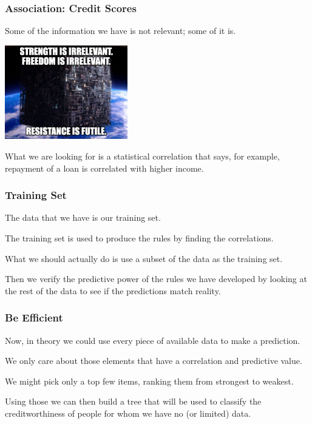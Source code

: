 \begin{frame}
\frametitle{Association: Credit Scores}

Some of the information we have is not relevant; some of it is. 

\begin{center}
	\includegraphics[width=0.4\textwidth]{images/futile.jpg}
\end{center}

What we are looking for is a statistical correlation that says, for example, repayment of a loan is correlated with higher income.


\end{frame}

\begin{frame}
\frametitle{Training Set}

The data that we have is our \alert{training set}. 

The training set is used to produce the rules by finding the correlations. 

What we should actually do is use a subset of the data as the training set. 

Then we verify the predictive power of the rules we have developed by looking at the rest of the data to see if the predictions match reality.


\end{frame}


\begin{frame}
\frametitle{Be Efficient}

Now, in theory we could use every piece of available data to make a prediction. 

We only care about those elements that have a correlation and predictive value. 

We might pick only a top few items, ranking them from strongest to weakest. 

Using those we can then build a tree that will be used to classify the creditworthiness of people for whom we have no (or limited) data.

\end{frame}

